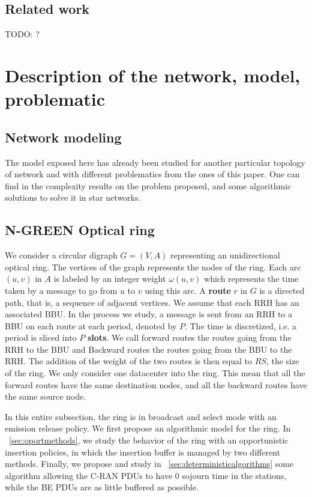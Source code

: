 \documentclass[]{algotel}
\newcommand{\todo}[1]{{\color{red} TODO: {#1}}}
\begin{document}
\subsection*{Related work}
\todo{?}

\section{Description of the network, model, problematic}


  \subsection{Network modeling}

The model exposed here has already been studied for another particular topology of network and with different problematics from the ones of this paper. One can find in \cite{latency2017} the complexity results on the problem proposed, and some algorithmic solutions to solve it in star networks.
          
  \subsection{N-GREEN Optical ring}
   
 We consider a circular digraph $G = (V,A)$ representing an unidirectional optical ring. The vertices of the graph represents the nodes of the ring. Each arc  $(u,v)$ in $A$ is labeled by an integer weight $\omega(u,v)$ which represents the time taken by a message to go from $u$ to $v$ using this arc.  A {\bf route} $r$ in $G$ is a directed path, that is, a sequence of adjacent vertices. 
 We assume that each RRH has an associated BBU.
  In the process we study, a message is sent from an RRH to a BBU on each route at each period, denoted by $P$. The time is discretized, i.e. a period is sliced into $P$ {\bf slots}. We call forward routes the routes going from the RRH to the BBU and Backward routes the routes going from the BBU to the RRH. The addition of the weight of the two routes is then equal to $RS$, the size of the ring. 
 We only consider one datacenter into the ring. This mean that all the forward routes have the same destination nodes, and all the backward routes have the same source node.

   In this entire subsection, the ring is in broadcast and select mode with an emission release policy. We first propose an algorithmic model for the ring. In ~\ref{sec:oportmethods}, we study the behavior of the ring with an opportunistic insertion policies, in which the insertion buffer is managed by two different methods. Finally, we propose and study in ~\ref{sec:deterministicalgorithms} some algorithm allowing the C-RAN PDUs to have $0$ sojourn time in the stations, while the BE PDUs are as little buffered as possible.
\end{document}
